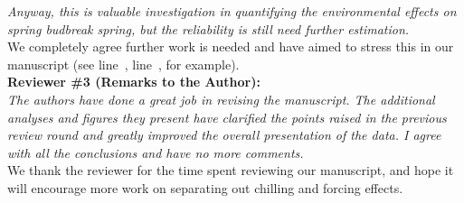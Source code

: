 \documentclass{article}
\newcommand{\lr}[1]{line~\lineref{#1}}
\begin{document}
\emph{Anyway, this is valuable investigation in quantifying the environmental effects on spring budbreak spring, but the reliability is still need further estimation.}\\

We completely agree further work is needed and have aimed to stress this in our manuscript (see \lr{R2_1}, \lr{R2_2}, for example).\\

{\bf Reviewer \#3 (Remarks to the Author):}\\

\emph{The authors have done a great job in revising the manuscript. The additional analyses and figures they present have clarified the points raised in the previous review round and greatly improved the overall presentation of the data. I agree with all the conclusions and have no more comments.}\\

We thank the reviewer for the time spent reviewing our manuscript, and hope it will encourage more work on separating out chilling and forcing effects. \\



\end{document}
